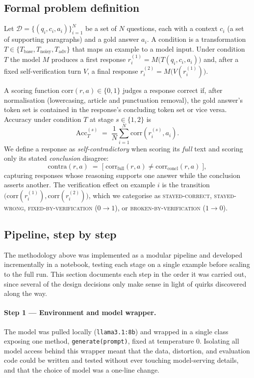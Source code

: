 \documentclass[11pt,a4paper]{article}
\begin{document}
\subsection{Formal problem definition}
Let $\mathcal{D}=\{(q_i,c_i,a_i)\}_{i=1}^{N}$ be a set of $N$ questions,
each with a context $c_i$ (a set of supporting paragraphs) and a gold
answer $a_i$. A condition is a transformation
$T \in \{T_{\text{base}}, T_{\text{noisy}}, T_{\text{adv}}\}$ that maps
an example to a model input. Under condition $T$ the model $M$ produces
a first response
$r_i^{(1)} = M\big(T(q_i,c_i,a_i)\big)$
and, after a fixed self-verification turn $V$, a final response
$r_i^{(2)} = M\big(V(r_i^{(1)})\big)$.

A scoring function $\mathrm{corr}(r,a)\in\{0,1\}$ judges a response
correct if, after normalisation (lowercasing, article and punctuation
removal), the gold answer's token set is contained in the response's
concluding token set or vice versa. Accuracy under condition $T$ at
stage $s\in\{1,2\}$ is
\[
\mathrm{Acc}_T^{(s)} \;=\; \frac{1}{N}\sum_{i=1}^{N}\mathrm{corr}\!\left(r_i^{(s)},a_i\right).
\]
We define a response as \emph{self-contradictory} when scoring its
\emph{full} text and scoring only its stated \emph{conclusion}
disagree:
\[
\mathrm{contra}(r,a) \;=\; \big[\;\mathrm{corr}_{\text{full}}(r,a) \neq \mathrm{corr}_{\text{concl}}(r,a)\;\big],
\]
capturing responses whose reasoning supports one answer while the
conclusion asserts another. The verification effect on example $i$ is
the transition $\big(\mathrm{corr}(r_i^{(1)}),\mathrm{corr}(r_i^{(2)})\big)$,
which we categorise as \textsc{stayed-correct}, \textsc{stayed-wrong},
\textsc{fixed-by-verification} ($0\!\to\!1$), or
\textsc{broken-by-verification} ($1\!\to\!0$).

\subsection{Pipeline, step by step}
\label{sec:pipeline}
The methodology above was implemented as a modular pipeline and
developed incrementally in a notebook, testing each stage on a single
example before scaling to the full run. This section documents each
step in the order it was carried out, since several of the design
decisions only make sense in light of quirks discovered along the way.

\paragraph{Step 1 --- Environment and model wrapper.}
The model was pulled locally (\texttt{llama3.1:8b}) and wrapped in a
single class exposing one method, \texttt{generate(prompt)}, fixed at
temperature $0$. Isolating all model access behind this wrapper meant
that the data, distortion, and evaluation code could be written and
tested without ever touching model-serving details, and that the
choice of model was a one-line change.
\end{document}

